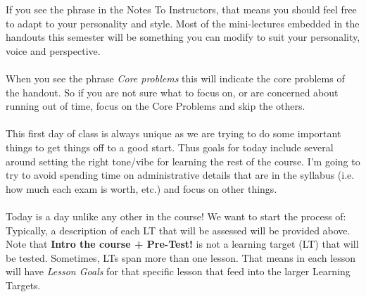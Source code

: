 \documentclass[10pt]{article}
\begin{document}
\pagestyle{otherpages}
\thispagestyle{firstpage}



If you see the phrase \mod in the Notes To Instructors, that means you should feel free to adapt to your personality and style.  Most of the mini-lectures embedded in the handouts this semester will be something you can modify to suit your personality, voice and perspective.   \\\\
When you see the phrase {\em Core problems} this will indicate the core problems of the handout. So if you are not sure what to focus on, or are concerned about running out of time, focus on the Core Problems and skip the others.\\\\
This first day of class is always unique as we are trying to do some important things to get things off to a good start. Thus goals for today include several around setting the right tone/vibe for learning the rest of the course. I'm going to try to avoid spending time on administrative details that are in the syllabus (i.e. how much each exam is worth, etc.) and focus on other things.\\\\
 Today is a day unlike any other in the course! We want to start the process of:
~\\
Typically, a description of each LT that will be assessed will be provided above.  Note that  {\bf Intro the course + Pre-Test!}  is not a learning target (LT) that will be tested.  Sometimes, LTs span more than one lesson. That means in each lesson will have {\em Lesson Goals} for that specific lesson that feed into the larger Learning Targets.
\\\\
\end{document}
